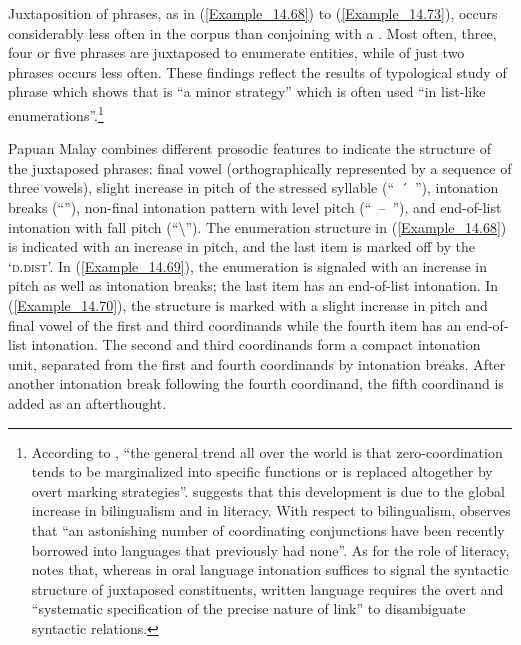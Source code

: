 Juxtaposition of  phrases, as in (\ref{Example_14.68}) to (\ref{Example_14.73}), occurs considerably less often in the corpus than conjoining with a . Most often, three, four or five  phrases are juxtaposed to enumerate entities, while  of just two  phrases occurs less often. These findings reflect the results of  typological study of  phrase  which shows that  is “a minor strategy” which is often used “in list-like enumerations”.\footnote{According to \citet[7–8]{Stassen.2000}, “the general trend all over the world is that zero-coordination tends to be marginalized into specific functions or is replaced altogether by overt marking strategies”. \citet[351–357]{Mithun.1988} suggests that this development is due to the global increase in bilingualism and in literacy. With respect to bilingualism, \citet[351]{Mithun.1988} observes that “an astonishing number of coordinating conjunctions have been recently borrowed into languages that previously had none”. As for the role of literacy, \citet[356]{Mithun.1988} notes that, whereas in oral language intonation suffices to signal the syntactic structure of juxtaposed constituents, written language requires the overt and “systematic specification of the precise nature of link” to disambiguate syntactic relations.}
%


Papuan Malay combines different prosodic features to indicate the structure of the juxtaposed  phrases: final vowel  (orthographically represented by a sequence of three vowels), slight increase in pitch of the stressed syllable (“~\'{~}~”), intonation breaks (“{\textbar}”), non-final intonation pattern with level pitch \mbox{(“ -- ”)}, and end-of-list intonation with fall pitch (“{\textbackslash}”). The enumeration structure in (\ref{Example_14.68}) is indicated with an increase in pitch, and the last item is marked off by the   ‘\textsc{d.dist}’. In (\ref{Example_14.69}), the enumeration is signaled with an increase in pitch as well as intonation breaks; the last item has an end-of-list intonation. In (\ref{Example_14.70}), the structure is marked with a slight increase in pitch and final vowel  of the first and third coordinands while the fourth item has an end-of-list intonation. The second and third coordinands form a compact intonation unit, separated from the first and fourth coordinands by intonation breaks. After another intonation break following the fourth coordinand, the fifth coordinand is added as an afterthought.
%

